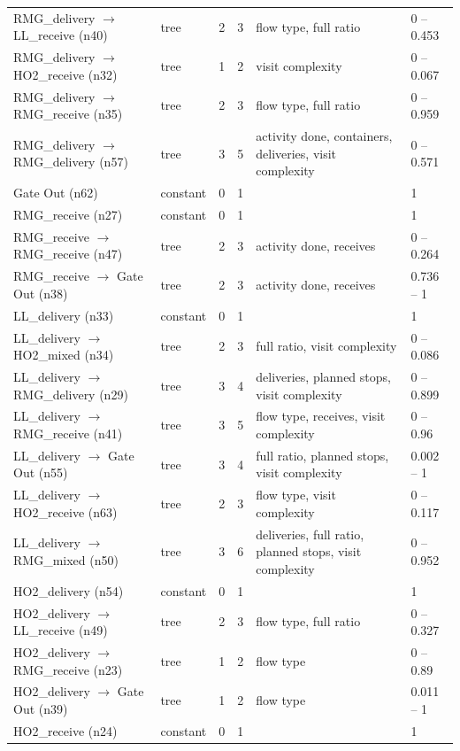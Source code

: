 \begin{longtable}{L{3.5cm}L{1.5cm}rrL{3.4cm}L{1.6cm}}
RMG\_delivery $\rightarrow$ LL\_receive (n40) & tree & 2 & 3 & flow type, full ratio & 0 -- 0.453 \\
RMG\_delivery $\rightarrow$ HO2\_receive (n32) & tree & 1 & 2 & visit complexity & 0 -- 0.067 \\
RMG\_delivery $\rightarrow$ RMG\_receive (n35) & tree & 2 & 3 & flow type, full ratio & 0 -- 0.959 \\
RMG\_delivery $\rightarrow$ RMG\_delivery (n57) & tree & 3 & 5 & activity done, containers, deliveries, visit complexity & 0 -- 0.571 \\
Gate Out (n62) & constant & 0 & 1 &  & 1 \\
RMG\_receive (n27) & constant & 0 & 1 &  & 1 \\
RMG\_receive $\rightarrow$ RMG\_receive (n47) & tree & 2 & 3 & activity done, receives & 0 -- 0.264 \\
RMG\_receive $\rightarrow$ Gate Out (n38) & tree & 2 & 3 & activity done, receives & 0.736 -- 1 \\
LL\_delivery (n33) & constant & 0 & 1 &  & 1 \\
LL\_delivery $\rightarrow$ HO2\_mixed (n34) & tree & 2 & 3 & full ratio, visit complexity & 0 -- 0.086 \\
LL\_delivery $\rightarrow$ RMG\_delivery (n29) & tree & 3 & 4 & deliveries, planned stops, visit complexity & 0 -- 0.899 \\
LL\_delivery $\rightarrow$ RMG\_receive (n41) & tree & 3 & 5 & flow type, receives, visit complexity & 0 -- 0.96 \\
LL\_delivery $\rightarrow$ Gate Out (n55) & tree & 3 & 4 & full ratio, planned stops, visit complexity & 0.002 -- 1 \\
LL\_delivery $\rightarrow$ HO2\_receive (n63) & tree & 2 & 3 & flow type, visit complexity & 0 -- 0.117 \\
LL\_delivery $\rightarrow$ RMG\_mixed (n50) & tree & 3 & 6 & deliveries, full ratio, planned stops, visit complexity & 0 -- 0.952 \\
HO2\_delivery (n54) & constant & 0 & 1 &  & 1 \\
HO2\_delivery $\rightarrow$ LL\_receive (n49) & tree & 2 & 3 & flow type, full ratio & 0 -- 0.327 \\
HO2\_delivery $\rightarrow$ RMG\_receive (n23) & tree & 1 & 2 & flow type & 0 -- 0.89 \\
HO2\_delivery $\rightarrow$ Gate Out (n39) & tree & 1 & 2 & flow type & 0.011 -- 1 \\
HO2\_receive (n24) & constant & 0 & 1 &  & 1 \\

\end{longtable}
